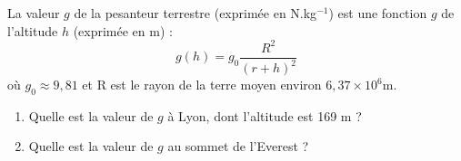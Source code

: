 
La valeur $g$ de la pesanteur terrestre (exprimée en N.kg$^{-1}$) est une fonction $g$ de l'altitude $h$ (exprimée en m) : $$g(h)=g_0\frac{R^2}{(r+h)^2}$$  où $g_0 \approx 9,81$ et R est le rayon de la terre moyen environ $6,37 \times 10^6$m.
\begin{enumerate}
\item Quelle est la valeur de $g$ à Lyon, dont l'altitude est 169 m ?
\item Quelle est la valeur de $g$ au sommet de l'Everest ?
\end{enumerate}